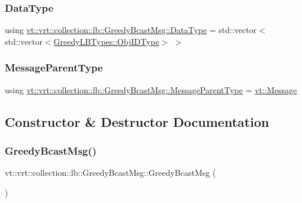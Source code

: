 \subsubsection{\texorpdfstring{Data\+Type}{DataType}}
{\footnotesize\ttfamily using \hyperlink{structvt_1_1vrt_1_1collection_1_1lb_1_1_greedy_bcast_msg_a56f882aadc6658debe93c6523b4e524f}{vt\+::vrt\+::collection\+::lb\+::\+Greedy\+Bcast\+Msg\+::\+Data\+Type} =  std\+::vector$<$std\+::vector$<$\hyperlink{structvt_1_1vrt_1_1collection_1_1lb_1_1_greedy_l_b_types_ae22670acd689e4ff83315fac2e4acb5e}{Greedy\+L\+B\+Types\+::\+Obj\+I\+D\+Type}$>$ $>$}

\mbox{\label{structvt_1_1vrt_1_1collection_1_1lb_1_1_greedy_bcast_msg_aa770154dd178530ce54fc2327e61ef21}} 
\subsubsection{\texorpdfstring{Message\+Parent\+Type}{MessageParentType}}
{\footnotesize\ttfamily using \hyperlink{structvt_1_1vrt_1_1collection_1_1lb_1_1_greedy_bcast_msg_aa770154dd178530ce54fc2327e61ef21}{vt\+::vrt\+::collection\+::lb\+::\+Greedy\+Bcast\+Msg\+::\+Message\+Parent\+Type} =  \hyperlink{namespacevt_a3a3ddfef40b4c90915fa43cdd5f129ea}{vt\+::\+Message}}



\subsection{Constructor \& Destructor Documentation}
\mbox{\label{structvt_1_1vrt_1_1collection_1_1lb_1_1_greedy_bcast_msg_ad5e17f7c8d56c12257cdb5ff69f3c335}} 
\subsubsection{\texorpdfstring{Greedy\+Bcast\+Msg()}{GreedyBcastMsg()}\hspace{0.1cm}{\footnotesize\ttfamily [1/2]}}
{\footnotesize\ttfamily vt\+::vrt\+::collection\+::lb\+::\+Greedy\+Bcast\+Msg\+::\+Greedy\+Bcast\+Msg (\begin{DoxyParamCaption}{ }\end{DoxyParamCaption})\hspace{0.3cm}{\ttfamily [default]}}


